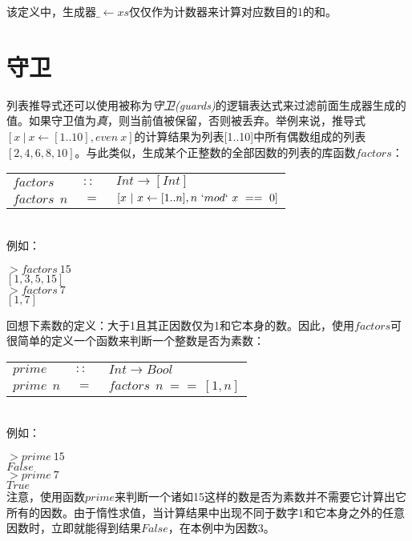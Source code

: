 \noindent 该定义中，生成器$\_\leftarrow xs$仅仅作为计数器来计算对应数目的1的和。
\section{守卫}
列表推导式还可以使用被称为\textit{守卫(guards)}的逻辑表达式来过滤前面生成器生成的值。如果守卫值为\textit{真}，则当前值被保留，否则被丢弃。举例来说，推导式$[x~|~x\leftarrow [1..10], even~x]$的计算结果为列表[1..10]中所有偶数组成的列表$[2,4,6,8,10]$。与此类似，生成某个正整数的全部因数的列表的库函数$factors$：
\\
  \begin{tabular}[t]{lll}
    $factors$&$~::~$&$Int \rightarrow [Int]$\\
    $factors~~n$&$~=~$&$[x~|~x\leftarrow [1..n], n~`mod`~x~==~0]$\\
  \end{tabular}
\\
\noindent 例如：

\noindent\hspace*{1cm}$>factors~15$\\
\hspace*{1cm}$[1,3,5,15]$
\\
\noindent\hspace*{1cm}$>factors~7$\\
\hspace*{1cm}$[1,7]$

\noindent 回想下素数的定义：大于1且其正因数仅为1和它本身的数。因此，使用$factors$可很简单的定义一个函数来判断一个整数是否为素数：\\
\begin{tabular}[t]{lll}
  $prime$&$~::~$&$Int \rightarrow Bool$\\
  $prime~~n$&$~=~$&$factors~~n~==~[1,n]$
\end{tabular}
\\
\noindent 例如：

\noindent\hspace*{1cm}$>prime~15$\\
\hspace*{1cm}$False$\\

\noindent\hspace*{1cm}$>prime~7$\\
\hspace*{1cm}$True$\\

注意，使用函数$prime$来判断一个诸如15这样的数是否为素数并不需要它计算出它所有的因数。由于惰性求值，当计算结果中出现不同于数字1和它本身之外的任意因数时，立即就能得到结果$False$，在本例中为因数3。

